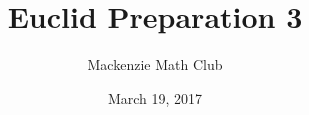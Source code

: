 

\usepackage{cleveref}
\usepackage{tikz}
\usepackage{tkz-euclide}
\usetikzlibrary{angles,quotes}

\title{Euclid Preparation 3}
\author{Mackenzie Math Club}
\date{March 19, 2017}


\theoremstyle{definition}
\newtheorem{theorem}{Theorem}
\newtheorem{extension}{Extension}[theorem]
\newtheorem*{properties}{Properties}

\newenvironment{TheoremSide}[1]{\begin{minipage}{0.7\textwidth}\begin{theorem}[#1]~\\}{\end{theorem}\end{minipage}}
\newenvironment{ExtensionSide}[1]{\begin{minipage}{0.7\textwidth}\begin{extension}[#1]~\\}{\end{extension}\end{minipage}}
\newenvironment{DiagramSide}{\begin{minipage}[c][4.35cm]{0.3\textwidth}\centering}{\end{minipage}}
\newenvironment{PropertiesSide}[1]{\begin{minipage}{0.7\textwidth}\begin{properties}[#1]~\\}{\end{properties}\end{minipage}}



